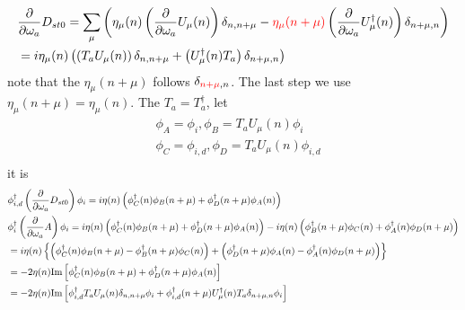 \begin{equation}
\begin{split}
&\frac{\partial }{\partial \omega _a}  D_{st0}=\sum _{\mu}\left(\eta _{\mu}(n)\left(\frac{\partial }{\partial \omega _a}U_{\mu}(n)\right) \delta _{n,n+\mu} - \textcolor[rgb]{1,0,0}{\eta _{\mu}(n+\mu)}\left(\frac{\partial }{\partial \omega _a} U^{\dagger}_{\mu}(n)\right)\delta _{n+\mu,n}\right)\\
&=i\eta _{\mu}(n)\left(\left(T_aU_{\mu}(n)\right) \delta _{n,n+\mu} + \left(U^{\dagger}_{\mu}(n)T_a\right)\delta _{n+\mu,n}\right)\\
\end{split}
\end{equation}
note that the $\eta _{\mu} (n+\mu)$ follows $\delta _{\textcolor[rgb]{1,0,0}{n+\mu},n}$. The last step we use $\eta _{\mu}(n+\mu)=\eta_{\mu}(n)$.
The $T_a=T_a^{\dagger}$, let
\begin{equation}
\begin{split}
&\phi _A = \phi _i, \phi _B = T_aU_{\mu}(n)\phi _i\\
&\phi _C = \phi _{i,d}, \phi _D = T_aU_{\mu}(n)\phi _{i,d}\\
\end{split}
\end{equation}
it is
\begin{equation}
\begin{split}
&\phi _{i,d}^{\dagger}\left(\frac{\partial }{\partial \omega _a}D_{st0}\right)\phi _i = i\eta(n)\left(\phi _C^{\dagger}(n)\phi _B(n+\mu) + \phi _D^{\dagger}(n+\mu) \phi _A(n)\right)\\
&\phi _i^{\dagger}\left(\frac{\partial }{\partial \omega _a}A\right)\phi _i=i\eta(n)\left(\phi _C^{\dagger}(n)\phi _B(n+\mu) + \phi _D^{\dagger}(n+\mu)\phi _A(n)\right)-i\eta(n)\left(\phi _B^{\dagger}(n+\mu)\phi _C(n) + \phi _A^{\dagger}(n)\phi _D(n+\mu)\right)\\
&=i\eta (n)\left\{\left(\phi _C^{\dagger}(n)\phi _B(n+\mu)-\phi _B^{\dagger}(n+\mu)\phi _C(n)\right)+\left( \phi _D^{\dagger}(n+\mu)\phi _A(n)-\phi _A^{\dagger}(n)\phi _D(n+\mu)\right)\right\}\\
&=-2\eta (n) {\rm Im}\left[\phi _C^{\dagger}(n)\phi _B(n+\mu) + \phi _D^{\dagger}(n+\mu)\phi _A(n)\right]\\
&=-2\eta (n) {\rm Im}\left[\phi _{i,d}^{\dagger}T_aU_{\mu}(n) \delta _{n,n+\mu}\phi _i + \phi _{i,d}^{\dagger}(n+\mu)U^{\dagger}_{\mu}(n)T_a\delta _{n+\mu,n}\phi _i\right]\\
\end{split}
\end{equation}
